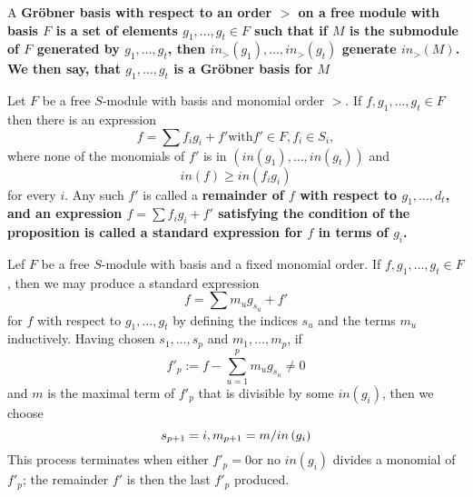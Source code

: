 \documentclass{article}
\begin{document}
\begin{defn}
	A \bf{Gr\"obner basis} with respect to an order \(  > \) on a free module with basis \( F\) is a set of elements \( g_1, \dots , g_t \in F \) such that if \( M \) is the submodule of \( F \) generated by \( g_1 , \dots,g_t \), then \( in_{>} \left(  g_1 \right),\dots, in_{>} \left( g_t \right) \) generate \( in_{>} \left( M \right)\).
	We then say, that \( g_1, \dots, g_t \) is a \bf{ Gr\"obner basis for \( M \) }
\end{defn}
\begin{propdef}[ \nocite{Eis1}{15.6}]
	Let \( F \) be a free \( S \)-module with basis and monomial order \( > \). If \( f,g_1,\dots,g_t \in F \) then there is an expression
	\[
		f= \sum f_i g_i +f' \text{with} f' \in F, f_i \in S_i ,
	\]
	where none of the monomials of \( f'\) is in 
	\( \left( in(g_1),\dots,in(g_t) \right) \) and
	\[
		in\left( f \right) \ge in\left( f_i g_i  \right)
	\]
	for every \( i \). Any such \( f' \) is called a \bf{remainder} of \( f \) with respect to \( g_1,\dots,d_t \), and an expression 
	\( f=\sum f_i g_i + f' \)
	satisfying the condition of the proposition is called a \bf{standard expression} for \( f \) in terms of \( g_i \).
\end{propdef}
\begin{algo}
	Lef \( F \) be a free \( S\)-module with basis and a fixed monomial order. 
	If 
	\( f,g_1,\dots,g_t \in F \)
	, then we may produce a standard expression
	\[
		f=\sum m_u g_{s_u} +f'
	\]
	for \(f\) with respect to 
	\( g_1,\dots,g_t \)
	by defining the indices \(s_u\)
	and the terms \(m_u\) inductively.
	Having chosen 
	\( s_1,\dots,s_p \)
	and 
	\( m_1,\dots,m_p\),
	if 
	\[
		f'_p:=f-\sum_{u=1}^{p} m_u g_{s_u} \neq 0
	\]
and \( m \) is the maximal term of \(f'_p \) that is divisible by some \( in\left( g_i \right) \),
then we choose
	\[
		s_{p+1}=i , \\
		m_{p+1}=m / in\left( g_i \right)
	\]
	This process terminates when either 
	\( f'_p=0 \)or no \( in\left( g_i \right) \) divides a monomial of 
	\( f'_p\);
	the remainder \(f'\) is then the last \( f'_p \) produced.
\end{algo}
\end{document}
